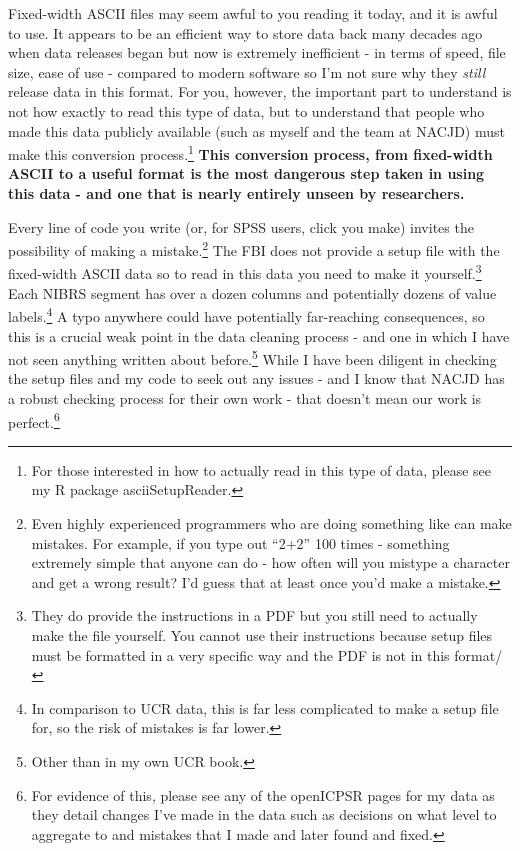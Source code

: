 \documentclass[
  12pt,
  openany]{book}
\begin{document}
Fixed-width ASCII files may seem awful to you reading it today, and it is awful to use. It appears to be an efficient way to store data back many decades ago when data releases began but now is extremely inefficient - in terms of speed, file size, ease of use - compared to modern software so I'm not sure why they \emph{still} release data in this format. For you, however, the important part to understand is not how exactly to read this type of data, but to understand that people who made this data publicly available (such as myself and the team at NACJD) must make this conversion process.\footnote{For those interested in how to actually read in this type of data, please see my R package asciiSetupReader.} \textbf{This conversion process, from fixed-width ASCII to a useful format is the most dangerous step taken in using this data - and one that is nearly entirely unseen by researchers.}

Every line of code you write (or, for SPSS users, click you make) invites the possibility of making a mistake.\footnote{Even highly experienced programmers who are doing something like can make mistakes. For example, if you type out ``2+2'' 100 times - something extremely simple that anyone can do - how often will you mistype a character and get a wrong result? I'd guess that at least once you'd make a mistake.} The FBI does not provide a setup file with the fixed-width ASCII data so to read in this data you need to make it yourself.\footnote{They do provide the instructions in a PDF but you still need to actually make the file yourself. You cannot use their instructions because setup files must be formatted in a very specific way and the PDF is not in this format/} Each NIBRS segment has over a dozen columns and potentially dozens of value labels.\footnote{In comparison to UCR data, this is far less complicated to make a setup file for, so the risk of mistakes is far lower.} A typo anywhere could have potentially far-reaching consequences, so this is a crucial weak point in the data cleaning process - and one in which I have not seen anything written about before.\footnote{Other than in my own UCR book.} While I have been diligent in checking the setup files and my code to seek out any issues - and I know that NACJD has a robust checking process for their own work - that doesn't mean our work is perfect.\footnote{For evidence of this, please see any of the openICPSR pages for my data as they detail changes I've made in the data such as decisions on what level to aggregate to and mistakes that I made and later found and fixed.}
\end{document}
